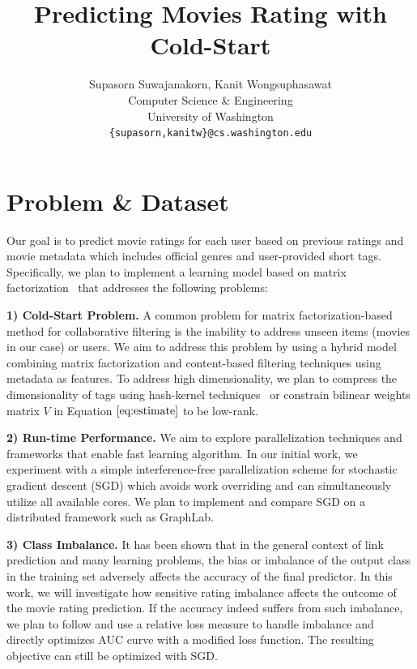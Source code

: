 \documentclass{article} %
\title{Predicting Movies Rating with Cold-Start}
\author{
Supasorn Suwajanakorn, Kanit Wongsuphasawat \\
Computer Science \& Engineering\\
University of Washington\\
\texttt{\{supasorn,kanitw\}@cs.washington.edu} \\
}
\begin{document}
\maketitle


\section{Problem \& Dataset}

Our goal is to predict movie ratings for each user based on previous ratings and movie metadata which includes official genres and user-provided short tags.  Specifically, we plan to implement a learning model based on matrix factorization~\cite{koren:matrix} that addresses the following problems:

\textbf{1) Cold-Start Problem.}  A common problem for matrix factorization-based method for collaborative filtering is the inability to address unseen items (movies in our case) or users.  We aim to address this problem by using a hybrid model combining matrix factorization and content-based filtering techniques using metadata as features.  To address high dimensionality, we plan to compress the dimensionality of tags using hash-kernel techniques~\cite{shi:hashkernels} or constrain bilinear weights matrix $V$ in Equation $\ref{eq:estimate}$ to be low-rank.

\textbf{2) Run-time Performance.}  We aim to explore parallelization techniques and frameworks that enable fast learning algorithm.  In our initial work, we experiment with a simple interference-free parallelization scheme for stochastic gradient descent (SGD) which avoids work overriding and can simultaneously utilize all available cores. We plan to implement and compare SGD on a distributed framework such as GraphLab.


\textbf{3) Class Imbalance.}  It has been shown that in the general context of link prediction and many learning problems, the bias or imbalance of the output class in the training set adversely affects the accuracy of the final predictor. In this work, we will investigate how sensitive rating imbalance affects the outcome of the movie rating prediction. If the accuracy indeed suffers from such imbalance, we plan to follow \cite{menon:link-prediction} and use a relative loss measure to handle imbalance and directly optimizes AUC curve with a modified loss function. The resulting objective can still be optimized with SGD.
\end{document}
